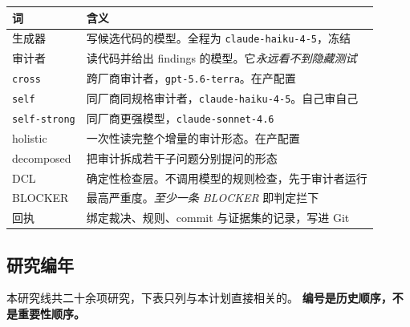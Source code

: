 \documentclass[11pt,a4paper]{article}
\begin{document}
\begin{center}
\begin{tabular}{@{}lp{10.2cm}@{}}
\toprule
\textbf{词} & \textbf{含义} \\
\midrule
生成器 & 写候选代码的模型。全程为 \texttt{claude-haiku-4-5}，冻结 \\
审计者 & 读代码并给出 findings 的模型。它\emph{永远看不到隐藏测试} \\
\texttt{cross} & 跨厂商审计者，\texttt{gpt-5.6-terra}。在产配置 \\
\texttt{self} & 同厂商同规格审计者，\texttt{claude-haiku-4-5}。自己审自己 \\
\texttt{self-strong} & 同厂商更强模型，\texttt{claude-sonnet-4.6} \\
holistic & 一次性读完整个增量的审计形态。在产配置 \\
decomposed & 把审计拆成若干子问题分别提问的形态 \\
DCL & 确定性检查层。不调用模型的规则检查，先于审计者运行 \\
BLOCKER & 最高严重度。\emph{至少一条 BLOCKER} 即判定拦下 \\
回执 & 绑定裁决、规则、commit 与证据集的记录，写进 Git \\
\bottomrule
\end{tabular}
\end{center}

\subsection{研究编年}

本研究线共二十余项研究，下表只列与本计划直接相关的。
\textbf{编号是历史顺序，不是重要性顺序。}
\end{document}
